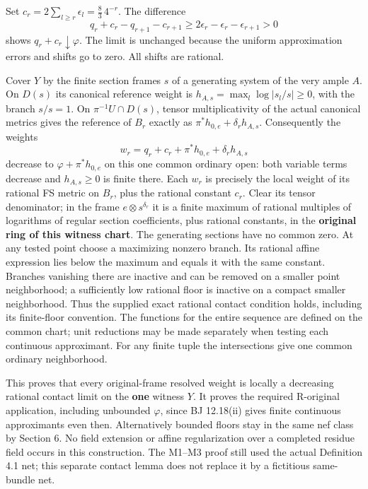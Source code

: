 \documentclass[
  10pt,
]{article}
\begin{document}
Set \(c_r=2\sum_{l\ge r}\epsilon_l=\frac83\,4^{-r}\). The difference
\[q_r+c_r-q_{r+1}-c_{r+1}\ge2\epsilon_r-\epsilon_r-\epsilon_{r+1}>0\]
shows \(q_r+c_r\downarrow\varphi\). The limit is unchanged because the
uniform approximation errors and shifts go to zero. All shifts are
rational.

Cover \(Y\) by the finite section frames \(s\) of a generating system of
the very ample \(A\). On \(D(s)\) its canonical reference weight is
\(h_{A,s}=\max_l\log|s_l/s|\ge0\), with the branch \(s/s=1\). On
\(\pi^{-1}U\cap D(s)\), tensor multiplicativity of the actual canonical
metrics gives the reference of \(B_r\) exactly as
\(\pi^*h_{0,e}+\delta_r h_{A,s}\). Consequently the weights
\[w_r=q_r+c_r+\pi^*h_{0,e}+\delta_r h_{A,s}                            \tag{7.3}\]
decrease to \(\varphi+\pi^*h_{0,e}\) on this one common ordinary open:
both variable terms decrease and \(h_{A,s}\ge0\) is finite there. Each
\(w_r\) is precisely the local weight of its rational FS metric on
\(B_r\), plus the rational constant \(c_r\). Clear its tensor
denominator; in the frame \(e\otimes s^{\delta_r}\) it is a finite
maximum of rational multiples of logarithms of regular section
coefficients, plus rational constants, in the \textbf{original ring of
this witness chart}. The generating sections have no common zero. At any
tested point choose a maximizing nonzero branch. Its rational affine
expression lies below the maximum and equals it with the same constant.
Branches vanishing there are inactive and can be removed on a smaller
point neighborhood; a sufficiently low rational floor is inactive on a
compact smaller neighborhood. Thus the supplied exact rational contact
condition holds, including its finite-floor convention. The functions
for the entire sequence are defined on the common chart; unit reductions
may be made separately when testing each continuous approximant. For any
finite tuple the intersections give one common ordinary neighborhood.

This proves that every original-frame resolved weight is locally a
decreasing rational contact limit on the \textbf{one} witness \(Y\). It
proves the required R-original application, including unbounded
\(\varphi\), since BJ 12.18(ii) gives finite continuous approximants
even then. Alternatively bounded floors stay in the same nef class by
Section 6. No field extension or affine regularization over a completed
residue field occurs in this construction. The M1--M3 proof still used
the actual Definition 4.1 net; this separate contact lemma does not
replace it by a fictitious same-bundle net.
\end{document}
